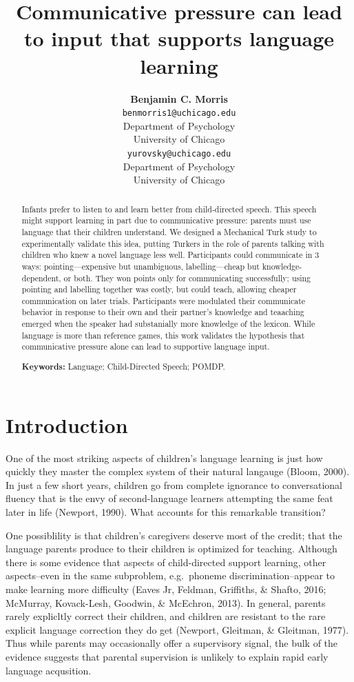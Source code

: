 \documentclass[10pt, letterpaper]{article}
\title{Communicative pressure can lead to input that supports language learning}
\author{{\large \bf Benjamin C. Morris} \\ \texttt{benmorris1@uchicago.edu} \\ Department of Psychology \\ University of Chicago \And {\large \bf Daniel Yurovsky} \\ \texttt{yurovsky@uchicago.edu} \\ Department of Psychology \\ University of Chicago}
\begin{document}
\maketitle

\begin{abstract}
Infants prefer to listen to and learn better from child-directed speech.
This speech might support learning in part due to communicative
pressure: parents must use language that their children understand. We
designed a Mechanical Turk study to experimentally validate this idea,
putting Turkers in the role of parents talking with children who knew a
novel language less well. Participants could communicate in 3 ways:
pointing---expensive but unambiguous, labelling---cheap but
knowledge-dependent, or both. They won points only for communicating
successfully; using pointing and labelling together was costly, but
could teach, allowing cheaper communication on later trials.
Participants were modulated their communicate behavior in response to
their own and their partner's knowledge and teaaching emerged when the
speaker had substanially more knowledge of the lexicon. While language
is more than reference games, this work validates the hypothesis that
communicative pressure alone can lead to supportive language input.

\textbf{Keywords:}
Language; Child-Directed Speech; POMDP.
\end{abstract}

\section{Introduction}\label{introduction}

One of the most striking aspects of children's language learning is just
how quickly they master the complex system of their natural langauge
(Bloom, 2000). In just a few short years, children go from complete
ignorance to conversational fluency that is the envy of second-language
learners attempting the same feat later in life (Newport, 1990). What
accounts for this remarkable transition?

One possiblility is that children's caregivers deserve most of the
credit; that the language parents produce to their children is optimized
for teaching. Although there is some evidence that aspects of
child-directed support learning, other aspects--even in the same
subproblem, e.g.~phoneme discrimination--appear to make learning more
difficulty (Eaves Jr, Feldman, Griffiths, \& Shafto, 2016; McMurray,
Kovack-Lesh, Goodwin, \& McEchron, 2013). In general, parents rarely
explicltly correct their children, and children are resistant to the
rare explicit language correction they do get (Newport, Gleitman, \&
Gleitman, 1977). Thus while parents may occasionally offer a supervisory
signal, the bulk of the evidence suggests that parental supervision is
unlikely to explain rapid early language acqusition.
\end{document}
